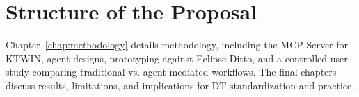 \section{Structure of the Proposal}

Chapter~\ref{chap:methodology} details methodology, including the MCP Server for KTWIN, agent designs, prototyping against Eclipse Ditto, and a controlled user study comparing traditional vs. agent-mediated workflows. The final chapters discuss results, limitations, and implications for DT standardization and practice.

